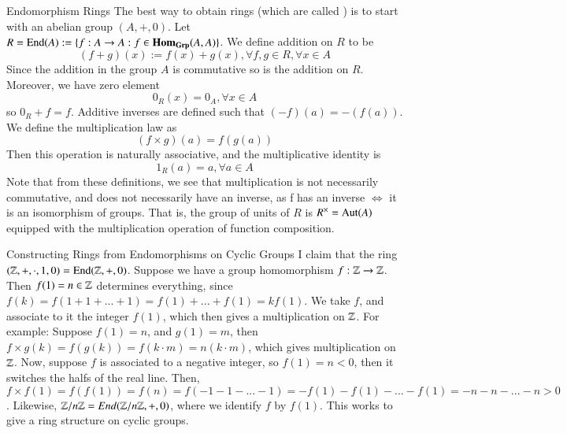 \documentclass[12pt, a4paper, twoside, openright, titlepage]{book}
\begin{document}
\begin{cons}{Endomorphism Rings}{}
    The best way to obtain rings (which are called ) is to start with an abelian group $(A,+,0)$. Let $R = \operatorname{End}(A) := \{f:A\rightarrow A: f \in \mathbf{Hom}_{\normalfont\textbf{Grp}}(A,A)\}$. We define addition on $R$ to be \begin{equation}
        (f+g)(x) := f(x)+g(x), \forall f,g \in R, \forall x \in A
    \end{equation}
    Since the addition in the group $A$ is commutative so is the addition on $R$. Moreover, we have zero element \begin{equation}
        0_R(x) = 0_A,\forall x \in A
    \end{equation}
    so $0_R  + f = f$. Additive inverses are defined such that $(-f)(a) = -(f(a))$. We define the multiplication law as \begin{equation}
        (f\times g)(a) = f(g(a))
    \end{equation}
    Then this operation is naturally associative, and the multiplicative identity is \begin{equation}
        1_R(a) = a, \forall a \in A
    \end{equation}
    Note that from these definitions, we see that multiplication is not necessarily commutative, and does not necessarily have an inverse, as f has an inverse $\iff$ it is an isomorphism of groups. That is, the group of units of $R$ is $R^{\times} = \operatorname{Aut}(A)$ equipped with the multiplication operation of function composition.
\end{cons}

\begin{eg}{Constructing Rings from Endomorphisms on Cyclic Groups}{}
        I claim that the ring $(\mathbb Z,+,\cdot,1,0) = \operatorname{End}(\mathbb Z,+,0)$. Suppose we have a group homomorphism $f:\mathbb Z\rightarrow \mathbb Z$. Then $f(1) = n \in \mathbb Z$ determines everything, since $f(k) = f(1+1+...+1) = f(1)+...+f(1) = kf(1)$. We take $f$, and associate to it the integer $f(1)$, which then gives a multiplication on $\mathbb Z$. For example: Suppose $f(1) = n$, and $g(1) = m$, then $f\times g(k) = f(g(k)) = f(k\cdot m) = n(k\cdot m)$, which gives multiplication on $\mathbb Z$. Now, suppose $f$ is associated to a negative integer, so $f(1) = n < 0$, then it switches the halfs of the real line. Then, $f\times f(1) = f(f(1)) = f(n) = f(-1-1-...-1) = -f(1)-f(1)-...-f(1) = -n-n-...-n > 0$. Likewise, $\mathbb Z/n\mathbb Z = End(\mathbb Z/n\mathbb Z,+,0)$, where we identify $f$ by $f(1)$. This works to give a ring structure on cyclic groups.
\end{eg}
\end{document}
